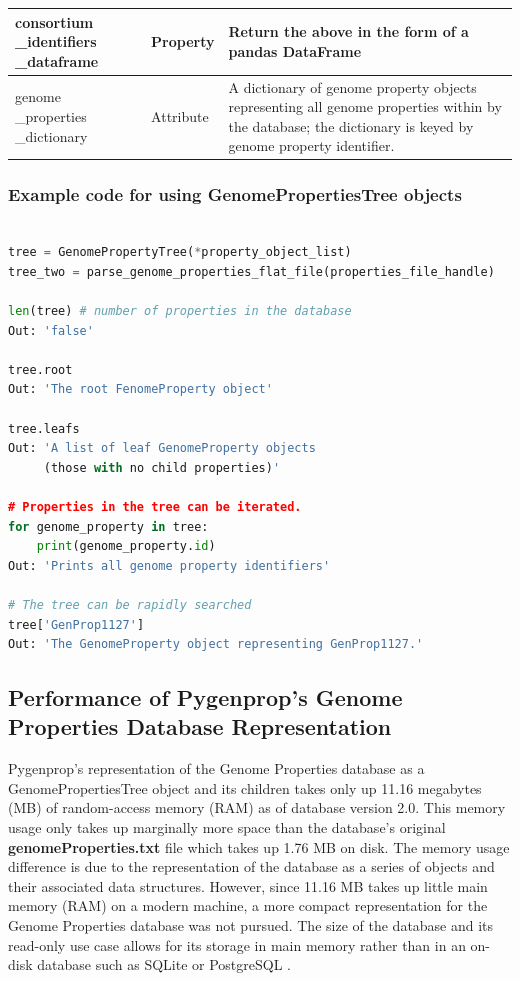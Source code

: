 \begin{longtable}{|p{2.7cm}|p{2cm}|p{10cm}|}
consortium \_identifiers \_dataframe   & Property  & Return the above in the form of a pandas DataFrame  \cite{mckinney2010data}                                                        \\ \hline
genome \_properties \_dictionary    & Attribute  & A dictionary of genome property objects representing all genome properties within by the database; the dictionary is keyed by genome property identifier.                              \\ \hline
\end{longtable}

\subsubsection{Example code for using GenomePropertiesTree objects}

\begin{lstlisting}[language=Python]

tree = GenomePropertyTree(*property_object_list)
tree_two = parse_genome_properties_flat_file(properties_file_handle)
	
len(tree) # number of properties in the database
Out: 'false'

tree.root
Out: 'The root FenomeProperty object'

tree.leafs
Out: 'A list of leaf GenomeProperty objects 
     (those with no child properties)'

# Properties in the tree can be iterated.
for genome_property in tree: 
	print(genome_property.id)
Out: 'Prints all genome property identifiers'

# The tree can be rapidly searched
tree['GenProp1127'] 
Out: 'The GenomeProperty object representing GenProp1127.'

\end{lstlisting}

\subsection{Performance of Pygenprop's Genome Properties Database Representation}

Pygenprop's representation of the Genome Properties database as a GenomePropertiesTree object and its children takes only up 11.16 megabytes (MB) of random-access memory (RAM) as of database version 2.0. This memory usage only takes up marginally more space than the database's original \textbf{genomeProperties.txt} file which takes up 1.76 MB on disk. The memory usage difference is due to the representation of the database as a series of objects and their associated data structures. However, since 11.16 MB takes up little main memory (RAM) on a modern machine, a more compact representation for the Genome Properties database was not pursued. The size of the database and its read-only use case allows for its storage in main memory rather than in an on-disk database such as SQLite \cite{owens2006definitive} or PostgreSQL \cite{momjian2001postgresql}.

